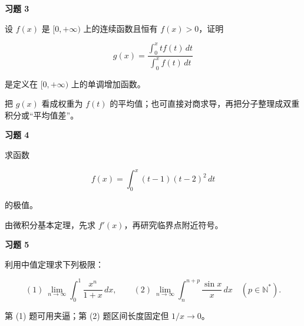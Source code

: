 \begin{exercisebox}
\textbf{习题 3 }

设 \(f(x)\) 是 \([0,+\infty)\) 上的连续函数且恒有 \(f(x)>0\)，证明

\[
        g(x)=\frac{\int_0^x t f(t)\,dt}{\int_0^x f(t)\,dt}
      \]

是定义在 \([0,+\infty)\) 上的单调增加函数。

\begin{hintbox}
把 \(g(x)\) 看成权重为 \(f(t)\) 的平均值；也可直接对商求导，再把分子整理成双重积分或“平均值差”。
\end{hintbox}
\end{exercisebox}

\begin{exercisebox}
\textbf{习题 4 }

求函数

\[
        f(x)=\int_0^x(t-1)(t-2)^2\,dt
      \]

的极值。

\begin{hintbox}
由微积分基本定理，先求 \(f'(x)\)，再研究临界点附近符号。
\end{hintbox}
\end{exercisebox}

\begin{exercisebox}
\textbf{习题 5 }

利用中值定理求下列极限：

\[
      (1)\ \lim_{n\to\infty}\int_0^1\frac{x^n}{1+x}\,dx,
      \qquad
      (2)\ \lim_{n\to\infty}\int_n^{n+p}\frac{\sin x}{x}\,dx\quad(p\in\mathbb N^*).
      \]

\begin{hintbox}
第 (1) 题可用夹逼；第 (2) 题区间长度固定但 \(1/x\to0\)。
\end{hintbox}
\end{exercisebox}

